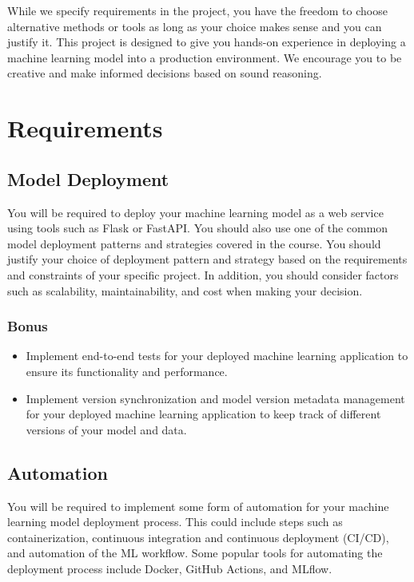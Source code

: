 \documentclass[a4paper]{article}
\begin{document}
	While we specify requirements in the project, you have the freedom to choose alternative methods or tools as long as your choice makes sense and you can justify it. This project is designed to give you hands-on experience in deploying a machine learning model into a production environment. We encourage you to be creative and make informed decisions based on sound reasoning.

			
	\section{Requirements}
	
	\subsection{Model Deployment}
	You will be required to deploy your machine learning model as a web service using tools such as Flask or FastAPI. You should also use one of the common model deployment patterns and strategies covered in the course. You should justify your choice of deployment pattern and strategy based on the requirements and constraints of your specific project. In addition, you should consider factors such as scalability, maintainability, and cost when making your decision.	
	
	\subsubsection{\textbf{Bonus}}
	\begin{itemize}
	\item Implement end-to-end tests for your deployed machine learning application to ensure its functionality and performance.
	\item Implement version synchronization and model version metadata management for your deployed machine learning application to keep track of different versions of your model and data.
	\end{itemize}


	\subsection{Automation}
	You will be required to implement some form of automation for your machine learning model deployment process. This could include steps such as containerization, continuous integration and continuous deployment (CI/CD), and automation of the ML workflow. Some popular tools for automating the deployment process include Docker, GitHub Actions, and MLflow.
	
\end{document}
